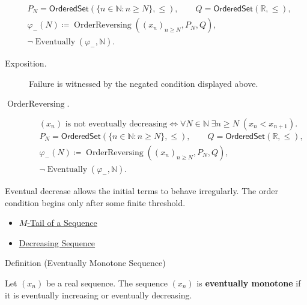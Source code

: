 \begin{remark*}
\[
\begin{aligned}
&P_N=\mathsf{OrderedSet}(\{n\in\mathbb{N}:n\ge N\},\leq),\qquad
Q=\mathsf{OrderedSet}(\mathbb{R},\leq),\\
&\varphi_{-}(N)\coloneqq
\operatorname{OrderReversing}((x_n)_{n\ge N},P_N,Q),\\
&\neg\operatorname{Eventually}(\varphi_{-},\mathbb{N}).
\end{aligned}
\]
\end{remark*}
\begin{remark*}
\begin{description}
  \item[Exposition.]
Failure is witnessed by the negated condition displayed above.
  \item[\(\operatorname{OrderReversing}.\)]
\[
(x_n)\text{ is not eventually decreasing}
\Longleftrightarrow
\forall N\in\mathbb{N}\;\exists n\ge N\;(x_n<x_{n+1}).
\]
\[
\begin{aligned}
&P_N=\mathsf{OrderedSet}(\{n\in\mathbb{N}:n\ge N\},\leq),\qquad
Q=\mathsf{OrderedSet}(\mathbb{R},\leq),\\
&\varphi_{-}(N)\coloneqq
\operatorname{OrderReversing}((x_n)_{n\ge N},P_N,Q),\\
&\neg\operatorname{Eventually}(\varphi_{-},\mathbb{N}).
\end{aligned}
\]
\end{description}
\end{remark*}

\begin{remark*}[Interpretation]
Eventual decrease allows the initial terms to behave irregularly. The order
condition begins only after some finite threshold.
\end{remark*}

\begin{dependencies}
\begin{itemize}
  \item \hyperref[def:m-tail]{$M$-Tail of a Sequence}
  \item \hyperref[def:decreasing-sequence]{Decreasing Sequence}
\end{itemize}
\end{dependencies}


\begin{definitionbox}{Definition (Eventually Monotone Sequence)}
\begin{definition}
\label{def:eventually-monotone-sequence}
Let $(x_n)$ be a real sequence. The sequence $(x_n)$ is
\textbf{eventually monotone} if it is eventually increasing or eventually
decreasing.
\end{definition}
\end{definitionbox}

